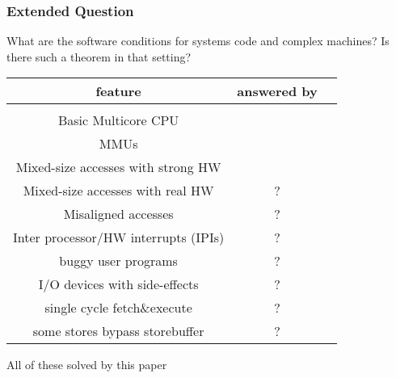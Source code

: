 \documentclass{beamer}
\begin{document}
\begin{frame}
\frametitle{Extended Question}
What are the software conditions for systems code and complex machines?
Is there such a theorem in that setting?

\begin{center}
\begin{tabular}{c|cc}
feature & answered by \\
\hline \\[2pt]
Basic Multicore CPU & \cite{cohen_schirmer} \\
MMUs & \cite{kovalev} \\
Mixed-size accesses with strong HW & \cite{Geng} \\
Mixed-size accesses with real HW & ? \\ 
Misaligned accesses & ? \\
Inter processor/HW interrupts (IPIs) & ? \\
buggy user programs & ? \\
I/O devices with side-effects & ? \\
single cycle fetch\&execute & ? \\
some stores bypass storebuffer & ? \\
\end{tabular}
\end{center}

All of these solved by this paper
\end{frame}
\end{document}
